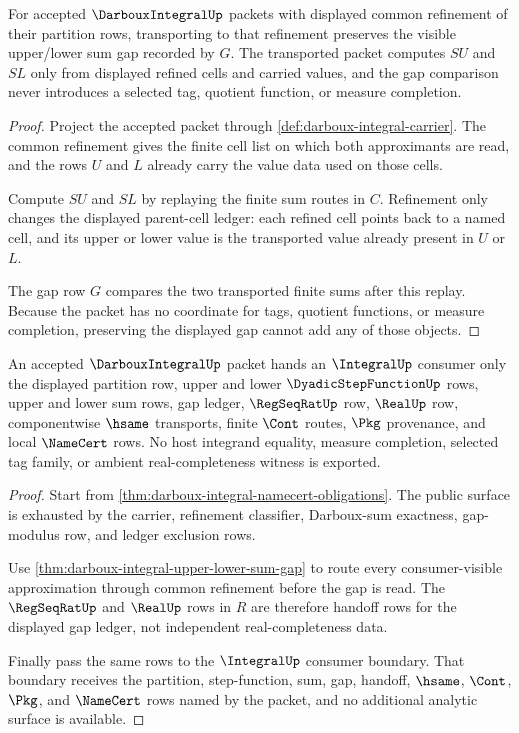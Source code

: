 \begin{theorem}
\label{thm:darboux-integral-upper-lower-sum-gap}
For accepted $\DarbouxIntegralUp$ packets with displayed common refinement of their partition rows, transporting to that refinement preserves the visible upper/lower sum gap recorded by $G$. The transported packet computes $SU$ and $SL$ only from displayed refined cells and carried values, and the gap comparison never introduces a selected tag, quotient function, or measure completion.
\end{theorem}
\begin{proof}
Project the accepted packet through \autoref{def:darboux-integral-carrier}. The common refinement gives the finite cell list on which both approximants are read, and the rows $U$ and $L$ already carry the value data used on those cells.

Compute $SU$ and $SL$ by replaying the finite sum routes in $C$. Refinement only changes the displayed parent-cell ledger: each refined cell points back to a named cell, and its upper or lower value is the transported value already present in $U$ or $L$.

The gap row $G$ compares the two transported finite sums after this replay. Because the packet has no coordinate for tags, quotient functions, or measure completion, preserving the displayed gap cannot add any of those objects.
\end{proof}

\begin{theorem}
\label{thm:darboux-integral-real-handoff}
An accepted $\DarbouxIntegralUp$ packet hands an $\IntegralUp$ consumer only the displayed partition row, upper and lower $\DyadicStepFunctionUp$ rows, upper and lower sum rows, gap ledger, $\RegSeqRatUp$ row, $\RealUp$ row, componentwise $\hsame$ transports, finite $\Cont$ routes, $\Pkg$ provenance, and local $\NameCert$ rows. No host integrand equality, measure completion, selected tag family, or ambient real-completeness witness is exported.
\end{theorem}
\begin{proof}
Start from \autoref{thm:darboux-integral-namecert-obligations}. The public surface is exhausted by the carrier, refinement classifier, Darboux-sum exactness, gap-modulus row, and ledger exclusion rows.

Use \autoref{thm:darboux-integral-upper-lower-sum-gap} to route every consumer-visible approximation through common refinement before the gap is read. The $\RegSeqRatUp$ and $\RealUp$ rows in $R$ are therefore handoff rows for the displayed gap ledger, not independent real-completeness data.

Finally pass the same rows to the $\IntegralUp$ consumer boundary. That boundary receives the partition, step-function, sum, gap, handoff, $\hsame$, $\Cont$, $\Pkg$, and $\NameCert$ rows named by the packet, and no additional analytic surface is available.
\end{proof}

